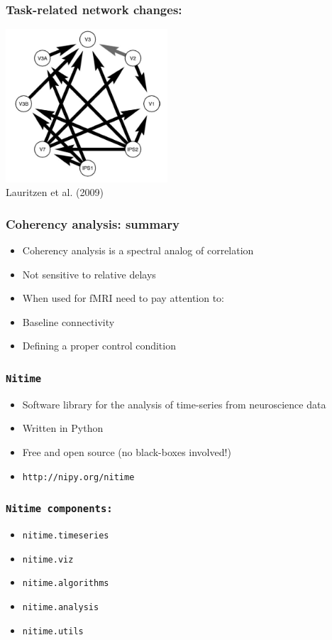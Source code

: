 \documentclass{beamer}
\begin{document}
\begin{frame}
\frametitle{Task-related network changes:}
\includegraphics[height=5.7cm]{figures/lauritzen8}
\\
\hfill 
Lauritzen et al. (2009)
\end{frame}

\begin{frame}
\frametitle{Coherency analysis: summary}
\pause
\begin{itemize}
\item
Coherency analysis is a spectral analog of correlation
\pause
\item 
Not sensitive to relative delays
\pause
\item
When used for fMRI need to pay attention to: 
\pause
\item  
Baseline connectivity
\pause
\item
Defining a proper control condition
\end{itemize}

\end{frame}

\begin{frame}
\frametitle{\tt{Nitime}}
\begin{itemize}
\pause
\item
Software library for the analysis of time-series from neuroscience data
\pause
\item
Written in Python
\pause
\item 
Free and open source (no black-boxes involved!)
\item
\pause
\tt{http://nipy.org/nitime}
\end{itemize}
\end{frame}


\begin{frame}
\frametitle{\tt{Nitime} components:}
\begin{itemize}
\pause
\item
\tt{nitime.timeseries}
\pause
\item
\tt{nitime.viz}
\pause
\item
\tt{nitime.algorithms}
\pause
\item
\tt{nitime.analysis}
\pause 
\item
\tt{nitime.utils}
\end{itemize}
\end{frame}
\end{document}
